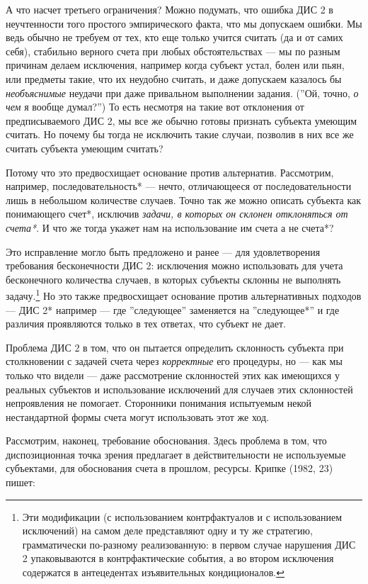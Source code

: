 \documentclass[11pt]{book}
\begin{document}
А что насчет третьего ограничения? Можно подумать, что ошибка ДИС 2 в неучтенности того простого эмпирического факта, что мы допускаем ошибки. Мы ведь обычно не требуем от тех, кто еще только учится считать (да и от самих себя), стабильно верного счета при любых обстоятельствах --- мы по разным причинам делаем исключения, например когда субъект устал, болен или пьян, или предметы такие, что их неудобно считать, и даже допускаем казалось бы \textit{необъяснимые} неудачи при даже привальном выполнении задания. (''Ой, точно, \textit{о чем} я вообще думал?'') То есть несмотря на такие вот отклонения от предписываемого ДИС 2, мы все же обычно готовы признать субъекта умеющим считать. Но почему бы тогда не исключить такие случаи, позволив в них все же считать субъекта умеющим считать?

Потому что это предвосхищает основание против альтернатив. Рассмотрим, например, последовательность* --- нечто, отличающееся от последовательности лишь в небольшом количестве случаев. Точно так же можно описать субъекта как понимающего счет*, исключив \textit{задачи, в которых он склонен отклоняться от счета*}. И что же тогда укажет нам на использование им счета а не счета*?

Это исправление могло быть предложено и ранее --- для удовлетворения требования бесконечности ДИС 2: исключения можно использовать для учета бесконечного количества случаев, в которых субъекты склонны не выполнять задачу.\footnote{Эти модификации (с использованием контрфактуалов и с использованием исключений) на самом деле представляют одну и ту же стратегию, грамматически по-разному реализованную: в первом случае нарушения ДИС 2 упаковываются в контрфактические события, а во втором исключения содержатся в антецедентах изъявительных кондиционалов.} Но это также предвосхищает основание против альтернативных подходов --- ДИС 2* например --- где ''следующее'' заменяется на ''следующее*'' и где различия проявляются только в тех ответах, что субъект не дает.

Проблема ДИС 2 в том, что он пытается определить склонность субъекта при столкновении с задачей счета через \textit{корректные} его процедуры, но --- как мы только что видели --- даже рассмотрение склонностей этих как имеющихся у реальных субъектов и использование исключений для случаев этих склонностей непроявления не помогает. Сторонники понимания испытуемым некой нестандартной формы счета могут использовать этот же ход.

Рассмотрим, наконец, требование обоснования. Здесь проблема в том, что диспозиционная точка зрения предлагает в действительности не используемые субъектами, для обоснования счета в прошлом, ресурсы. Крипке (1982, 23) пишет:
\end{document}
